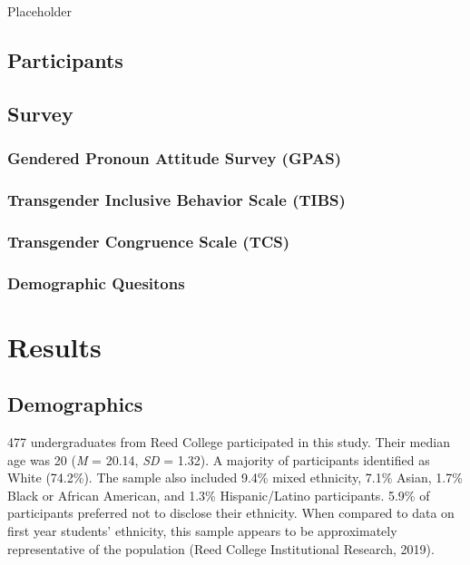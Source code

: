 \documentclass[12pt,twoside]{reedthesis}
\begin{document}
Placeholder

\hypertarget{participants}{%
\section{Participants}\label{participants}}

\hypertarget{survey}{%
\section{Survey}\label{survey}}

\hypertarget{gendered-pronoun-attitude-survey-gpas}{%
\subsection{Gendered Pronoun Attitude Survey (GPAS)}\label{gendered-pronoun-attitude-survey-gpas}}

\hypertarget{transgender-inclusive-behavior-scale-tibs}{%
\subsection{Transgender Inclusive Behavior Scale (TIBS)}\label{transgender-inclusive-behavior-scale-tibs}}

\hypertarget{transgender-congruence-scale-tcs}{%
\subsection{Transgender Congruence Scale (TCS)}\label{transgender-congruence-scale-tcs}}

\hypertarget{demographic-quesitons}{%
\subsection{Demographic Quesitons}\label{demographic-quesitons}}

\hypertarget{results}{%
\chapter{Results}\label{results}}

\hypertarget{demographics}{%
\section{Demographics}\label{demographics}}

477 undergraduates from Reed College participated in this study. Their median age was 20 (\emph{M} = 20.14, \emph{SD} = 1.32). A majority of participants identified as White (74.2\%). The sample also included 9.4\% mixed ethnicity, 7.1\% Asian, 1.7\% Black or African American, and 1.3\% Hispanic/Latino participants. 5.9\% of participants preferred not to disclose their ethnicity. When compared to data on first year students' ethnicity, this sample appears to be approximately representative of the population (Reed College Institutional Research, 2019).
\end{document}
